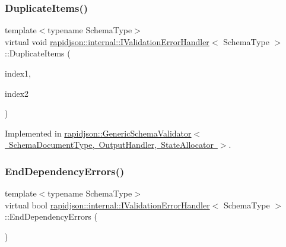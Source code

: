 \subsubsection{\texorpdfstring{DuplicateItems()}{DuplicateItems()}}
{\footnotesize\ttfamily template$<$typename Schema\+Type$>$ \\
virtual void \mbox{\hyperlink{classrapidjson_1_1internal_1_1_i_validation_error_handler}{rapidjson\+::internal\+::\+I\+Validation\+Error\+Handler}}$<$ Schema\+Type $>$\+::Duplicate\+Items (\begin{DoxyParamCaption}\item[{\mbox{\hyperlink{namespacerapidjson_a44eb33eaa523e36d466b1ced64b85c84}{Size\+Type}}}]{index1,  }\item[{\mbox{\hyperlink{namespacerapidjson_a44eb33eaa523e36d466b1ced64b85c84}{Size\+Type}}}]{index2 }\end{DoxyParamCaption})\hspace{0.3cm}{\ttfamily [pure virtual]}}



Implemented in \mbox{\hyperlink{classrapidjson_1_1_generic_schema_validator_a7ad5d50a8df51dd51012bd3a525b0366}{rapidjson\+::\+Generic\+Schema\+Validator$<$ Schema\+Document\+Type, Output\+Handler, State\+Allocator $>$}}.

\mbox{\label{classrapidjson_1_1internal_1_1_i_validation_error_handler_a473437062e5ce9daeb42c6673a33154b}} 
\subsubsection{\texorpdfstring{EndDependencyErrors()}{EndDependencyErrors()}}
{\footnotesize\ttfamily template$<$typename Schema\+Type$>$ \\
virtual bool \mbox{\hyperlink{classrapidjson_1_1internal_1_1_i_validation_error_handler}{rapidjson\+::internal\+::\+I\+Validation\+Error\+Handler}}$<$ Schema\+Type $>$\+::End\+Dependency\+Errors (\begin{DoxyParamCaption}{ }\end{DoxyParamCaption})\hspace{0.3cm}{\ttfamily [pure virtual]}}



